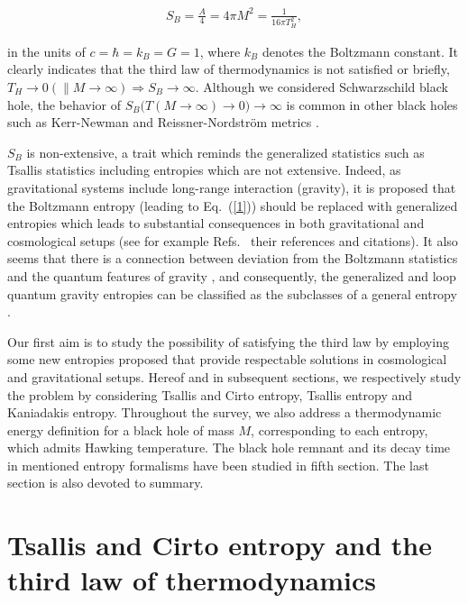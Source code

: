 \documentclass[twocolumn,preprintnumbers,amsmath,nofootinbib,amssymb]{revtex4}
\begin{document}
\begin{eqnarray}\label{1}
S_B=\frac{A}{4}=4\pi M^2=\frac{1}{16\pi T_H^2},
\end{eqnarray}

\noindent in the units of $c=\hbar=k_B=G=1$, where $k_B$ denotes
the Boltzmann constant. It clearly indicates that the third law of
thermodynamics is not satisfied or briefly,
$T_H\rightarrow0(\parallel M\rightarrow\infty)\Rightarrow
S_B\rightarrow\infty$. Although we considered Schwarzschild black
hole, the behavior of
$S_B\big(T(M\rightarrow\infty)\rightarrow0\big)\rightarrow\infty$
is common in other black holes such as Kerr-Newman and
Reissner-Nordstr\"{o}m metrics \cite{1,01,2,3,4}.

$S_B$ is non-extensive, a trait which reminds the generalized
statistics such as Tsallis statistics \cite{revT,masi} including
entropies which are not extensive. Indeed, as gravitational
systems include long-range interaction (gravity), it is proposed
that the Boltzmann entropy (leading to Eq.~(\ref{1})) should be
replaced with generalized entropies which leads to substantial
consequences in both gravitational and cosmological setups (see
for example
Refs.~\cite{tsallis,refgerg,gerg,non13,nonK,EPJC,KHDE,sadeghi,mesri2}
their references and citations). It also seems that there is a
connection between deviation from the Boltzmann statistics and the
quantum features of gravity \cite{epl,homa,mesri,barrow,mesri2},
and consequently, the generalized and loop quantum gravity
entropies can be classified as the subclasses of a general entropy
\cite{gen}.

Our first aim is to study the possibility of satisfying the third
law by employing some new entropies proposed that provide
respectable solutions in cosmological and gravitational setups.
Hereof and in subsequent sections, we respectively study the
problem by considering Tsallis and Cirto entropy, Tsallis entropy
and Kaniadakis entropy. Throughout the survey, we also address a
thermodynamic energy definition for a black hole of mass $M$,
corresponding to each entropy, which admits Hawking temperature.
The black hole remnant and its decay time in mentioned entropy
formalisms have been studied in fifth section. The last section is
also devoted to summary.

\section{Tsallis and Cirto entropy and the third law of
thermodynamics}\label{TC00}
\end{document}
